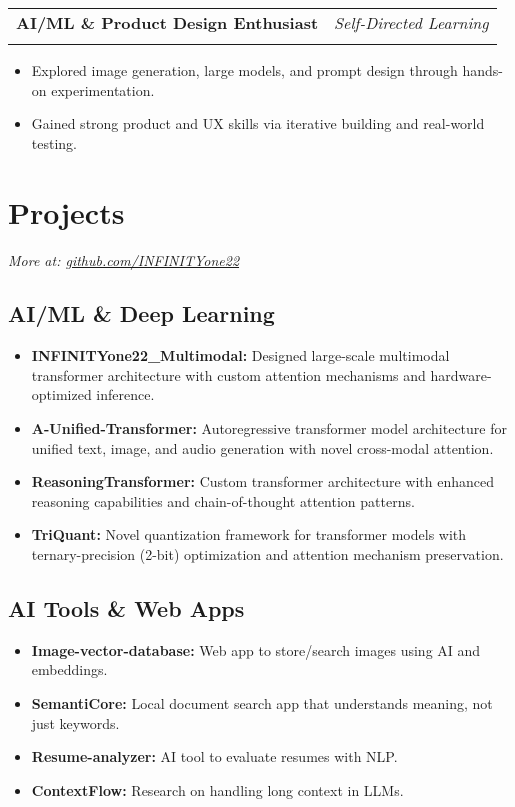 \documentclass[11pt,a4paper]{article}
\makeatletter
\newcommand{\resumeSubHeading}[4]{
  \vspace{-2pt}\begin{tabular*}{\textwidth}{l@{\extracolsep{\fill}}r}
    \textbf{#1} & \textit{#2} \\
    \textit{\small#3} & \textit{\small#4} \\
  \end{tabular*}\vspace{-2pt}
}
\makeatother
\begin{document}
\resumeSubHeading{AI/ML \& Product Design Enthusiast}{Self-Directed Learning}{}{}
\begin{itemize}
    \item Explored image generation, large models, and prompt design through hands-on experimentation.
    \item Gained strong product and UX skills via iterative building and real-world testing.
\end{itemize}

\section{Projects}
\textit{More at: \href{https://github.com/INFINITYone22}{github.com/INFINITYone22}}

\subsection{AI/ML \& Deep Learning}
\begin{itemize}
    \item \textbf{INFINITYone22\_Multimodal:} Designed large-scale multimodal transformer architecture with custom attention mechanisms and hardware-optimized inference.
    \item \textbf{A-Unified-Transformer:} Autoregressive transformer model architecture for unified text, image, and audio generation with novel cross-modal attention.
    \item \textbf{ReasoningTransformer:} Custom transformer architecture with enhanced reasoning capabilities and chain-of-thought attention patterns.
    \item \textbf{TriQuant:} Novel quantization framework for transformer models with ternary-precision (2-bit) optimization and attention mechanism preservation.
\end{itemize}

\subsection{AI Tools \& Web Apps}
\begin{itemize}
    \item \textbf{Image-vector-database:} Web app to store/search images using AI and embeddings.
    \item \textbf{SemantiCore:} Local document search app that understands meaning, not just keywords.
    \item \textbf{Resume-analyzer:} AI tool to evaluate resumes with NLP.
    \item \textbf{ContextFlow:} Research on handling long context in LLMs.
\end{itemize}
\end{document}
